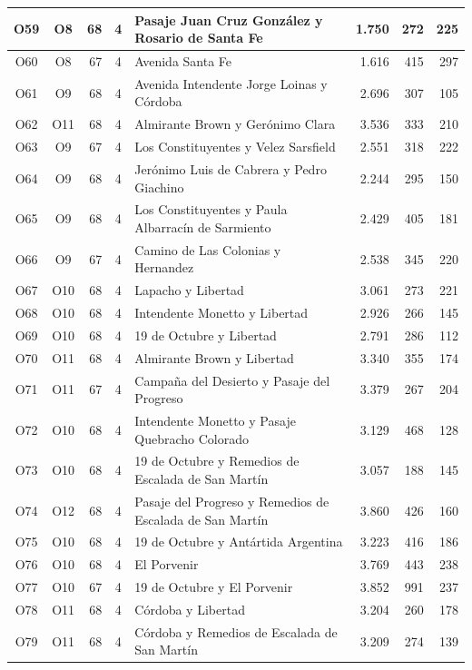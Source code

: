 \begin{longtable}{|c|c|r|c|p{4.2cm}|r|r|r|}
O59 & O8 & 68 & 4 & Pasaje Juan Cruz González y Rosario de Santa Fe & 1.750 & 272 & 225 \\ \hline
O60 & O8 & 67 & 4 & Avenida Santa Fe & 1.616 & 415 & 297 \\ \hline
O61 & O9 & 68 & 4 & Avenida Intendente Jorge Loinas y Córdoba & 2.696 & 307 & 105 \\ \hline
O62 & O11 & 68 & 4 & Almirante Brown y Gerónimo Clara & 3.536 & 333 & 210 \\ \hline
O63 & O9 & 67 & 4 & Los Constituyentes y Velez Sarsfield & 2.551 & 318 & 222 \\ \hline
O64 & O9 & 68 & 4 & Jerónimo Luis de Cabrera y Pedro Giachino & 2.244 & 295 & 150 \\ \hline
O65 & O9 & 68 & 4 & Los Constituyentes y Paula Albarracín de Sarmiento & 2.429 & 405 & 181 \\ \hline
O66 & O9 & 67 & 4 & Camino de Las Colonias y Hernandez & 2.538 & 345 & 220 \\ \hline
O67 & O10 & 68 & 4 & Lapacho y Libertad & 3.061 & 273 & 221 \\ \hline
O68 & O10 & 68 & 4 & Intendente Monetto y Libertad & 2.926 & 266 & 145 \\ \hline
O69 & O10 & 68 & 4 & 19 de Octubre y Libertad & 2.791 & 286 & 112 \\ \hline
O70 & O11 & 68 & 4 & Almirante Brown y Libertad & 3.340 & 355 & 174 \\ \hline
O71 & O11 & 67 & 4 & Campaña del Desierto y Pasaje del Progreso & 3.379 & 267 & 204 \\ \hline
O72 & O10 & 68 & 4 & Intendente Monetto y Pasaje Quebracho Colorado & 3.129 & 468 & 128 \\ \hline
O73 & O10 & 68 & 4 & 19 de Octubre y Remedios de Escalada de San Martín & 3.057 & 188 & 145 \\ \hline
O74 & O12 & 68 & 4 & Pasaje del Progreso y Remedios de Escalada de San Martín & 3.860 & 426 & 160 \\ \hline
O75 & O10 & 68 & 4 & 19 de Octubre y Antártida Argentina & 3.223 & 416 & 186 \\ \hline
O76 & O10 & 68 & 4 & El Porvenir & 3.769 & 443 & 238 \\ \hline
O77 & O10 & 67 & 4 & 19 de Octubre y El Porvenir & 3.852 & 991 & 237 \\ \hline
O78 & O11 & 68 & 4 & Córdoba y Libertad & 3.204 & 260 & 178 \\ \hline
O79 & O11 & 68 & 4 & Córdoba y Remedios de Escalada de San Martín & 3.209 & 274 & 139 \\ \hline

\end{longtable}
